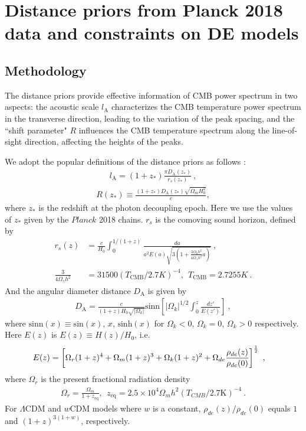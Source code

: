 \documentclass[floatfix,aps,amsmath,nofootinbib,onecolumn,10pt]{revtex4}
\def\half{{1\over 2}}
\def\half{{1\over 2}}
\def\[{\left[}
\def\]{\right]}
\begin{document}
\section{Distance priors from Planck 2018 data and constraints on DE models}
\label{body}

\subsection{Methodology}
\label{method}
The distance priors provide effective information of CMB power spectrum in two aspects: the acoustic scale $l_\textrm{A}$ characterizes the CMB temperature power spectrum in the transverse direction, leading to the variation of the peak spacing, and the ``shift parameter" $R$ influences the CMB temperature spectrum along the line-of-sight direction, affecting the heights of the peaks.
 
We adopt the popular definitions of the distance priors as follows \cite{Komatsu:2008hk}:
\begin{align}\label{la}
l_\textrm{A} =(1+z_*)\frac{\pi D_\textrm{A}(z_*)}{r_s(z_*)}\ ,
\end{align}
\begin{align}\label{Rz}
R(z_*)\equiv\frac{(1+z_*)D_\textrm{A}(z_*) \sqrt{\Omega_m H_0^2}}{c}, 
\end{align}
where $z_*$ is the redshift at the photon decoupling epoch. Here we use the values of $z_*$ given by the $Planck$ 2018 chains. $r_s$ is the comoving sound horizon, defined by
\begin{align}\label{}
r_s(z)  &= \frac{c}{H_0} \int_0^{1/(1+z)} \frac {da} {a^2E(a)\sqrt{3(1+\frac{3\Omega_bh^2}{4\Omega_\gamma h^2}a)}}\ ,\nonumber\\
\frac{3}{4\Omega_\gamma h^2}  &= 31500(T_{\textrm{CMB}}/2.7K)^{-4},~~T_{\textrm{CMB}}= 2.7255K\ .
\end{align}
And the angular diameter distance $D_\textrm{A}$ is given by
\begin{align}\label{}
D_\textrm{A}
=\frac{c}{(1+z) H_0 \sqrt{|\Omega_{k}|}  } \textrm{sinn}\left[|\Omega_{k}|^{1/2}\int_0^z \frac {dz'} {E(z')}\right]\ ,
\end{align}
where $\textrm{sinn}(x) \equiv \textrm{sin}(x)$, $x$, $\textrm{sinh}(x)$ for $\Omega_{k}<0$, $\Omega_{k}=0$, $\Omega_{k}>0$ respectively. Here $E(z)$ is $E(z) \equiv{ H(z)}/{H_0}$, i.e.
\begin{align}\label{}
E(z) &= \[ \Omega_{r}(1+z)^4+\Omega_m(1+z)^3+\Omega_{k}(1+z)^2+\Omega_{de} \frac {\rho_{de}(z)} {\rho_{de}(0)} \]^\half\ ,
\end{align}
where $\Omega_{r}$ is the present fractional radiation density
\begin{align}\label{}
\Omega_{r}=\frac{\Omega_{m}}{1+z_{\textrm{eq}}}, ~~z_{\textrm{eq}}=2.5\times10^{4}\Omega_{m}h^2\left(T_{CMB}/2.7\textrm{K}\right)^{-4}\ .
\end{align}
For $\Lambda$CDM and $w$CDM models where $w$ is a constant, $ {\rho_{de}(z)} /{\rho_{de}(0)}$ equals $1$ and $(1+z)^{3(1+w)}$, respectively.
 
\end{document}
